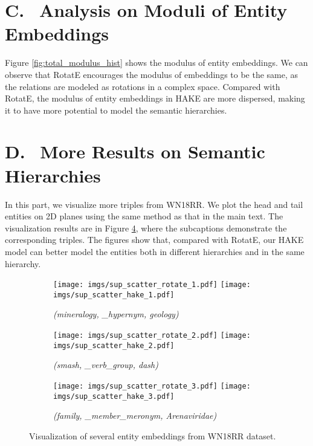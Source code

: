 \documentclass[letterpaper]{article} \usepackage{aaai20}  \usepackage{times}  \usepackage{helvet} \usepackage{courier}  \usepackage[hyphens]{url}  \usepackage{graphicx} \urlstyle{rm} \def\UrlFont{\rm}  \usepackage{graphicx}  \frenchspacing  \setlength{\pdfpagewidth}{8.5in}  \setlength{\pdfpageheight}{11in}
\begin{document}
\section*{C.\,\,\, Analysis on Moduli of Entity Embeddings}

Figure \ref{fig:total_modulus_hist} shows the modulus of entity embeddings. We can observe that RotatE encourages the modulus of embeddings to be the same, as the relations are modeled as rotations in a complex space. Compared with RotatE, the modulus of entity embeddings in HAKE are more dispersed, making it to have more potential to model the semantic hierarchies.

\section*{D.\,\,\, More Results on Semantic Hierarchies}

In this part, we visualize more triples from WN18RR. We plot the head and tail entities on 2D planes using the same method as that in the main text. The visualization results are in Figure \ref{fig:scatter_modulus2}, where the subcaptions demonstrate the corresponding triples. The figures show that, compared with RotatE, our HAKE model can better model the entities both in different hierarchies and in the same hierarchy. 

\vspace{5mm}
\begin{figure}[!ht]
  \centering \begin{subfigure}[b]{0.4\textwidth}
  \centering
  \texttt{[image: imgs/sup\_scatter\_rotate\_1.pdf]}\hspace{4mm}
  \texttt{[image: imgs/sup\_scatter\_hake\_1.pdf]}
  \caption{\textit{(mineralogy, \_hypernym, geology)}}
  \label{fig:scatter_modulus_sub1}
\end{subfigure} 

\vspace{2mm}
\begin{subfigure}[b]{0.4\textwidth}
  \centering
  \texttt{[image: imgs/sup\_scatter\_rotate\_2.pdf]}\hspace{4mm}
  \texttt{[image: imgs/sup\_scatter\_hake\_2.pdf]}
  \caption{\textit{(smash, \_verb\_group, dash)}}
  \label{fig:scatter_modulus_sub2}
\end{subfigure} 

\vspace{2mm}
\begin{subfigure}[b]{0.4\textwidth}
  \centering
  \texttt{[image: imgs/sup\_scatter\_rotate\_3.pdf]}\hspace{4mm}
  \texttt{[image: imgs/sup\_scatter\_hake\_3.pdf]}
  \caption{\textit{(family, \_member\_meronym, Arenaviridae)}}
  \label{fig:scatter_modulus_sub3}
\end{subfigure} 
\caption{Visualization of several entity embeddings from WN18RR dataset.}
\label{fig:scatter_modulus2}
\end{figure}
\end{document}
